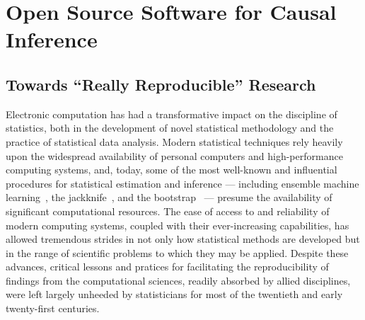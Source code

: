 \chapter{Open Source Software for Causal Inference}\label{five}

\section{Towards ``Really Reproducible'' Research}

Electronic computation has had a transformative impact on the discipline of
statistics, both in the development of novel statistical methodology and the
practice of statistical data analysis. Modern statistical techniques rely
heavily upon the widespread availability of personal computers and
high-performance computing systems, and, today, some of the most well-known and
influential procedures for statistical estimation and inference --- including
ensemble machine learning~\citep{wolpert1992stacked, breiman1996stacked,
vdl2007super}, the jackknife~\citep{efron1981nonparametric}, and the
bootstrap~\citep{efron1981nonparametric, efron1994introduction,
davison1997bootstrap} --- presume the availability of significant computational
resources. The ease of access to and reliability of modern computing systems,
coupled with their ever-increasing capabilities, has allowed tremendous strides
in not only how statistical methods are developed but in the range of scientific
problems to which they may be applied. Despite these advances, critical lessons
and pratices for facilitating the reproducibility of findings from the
computational sciences, readily absorbed by allied disciplines, were left
largely unheeded by statisticians for most of the twentieth and early
twenty-first centuries.

